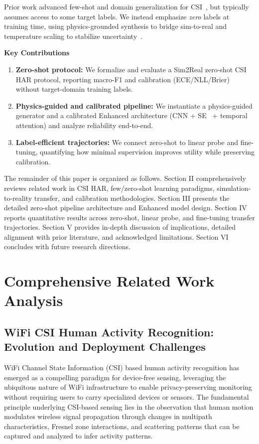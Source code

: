 \documentclass[journal]{IEEEtran}
\begin{document}
Prior work advanced few-shot and domain generalization for CSI~\cite{fewsense2022,airfi2022}, but typically assumes access to some target labels. We instead emphasize \emph{zero} labels at training time, using physics-grounded synthesis to bridge sim-to-real and temperature scaling to stabilize uncertainty~\cite{calibration_guo2017}.

\textbf{Key Contributions}
\begin{enumerate}
  \item \textbf{Zero-shot protocol:} We formalize and evaluate a Sim2Real zero-shot CSI HAR protocol, reporting macro-F1 and calibration (ECE/NLL/Brier) without target-domain training labels.
  \item \textbf{Physics-guided and calibrated pipeline:} We instantiate a physics-guided generator and a calibrated Enhanced architecture (CNN + SE~\cite{se_networks2018} + temporal attention) and analyze reliability end-to-end.
  \item \textbf{Label-efficient trajectories:} We connect zero-shot to linear probe and fine-tuning, quantifying how minimal supervision improves utility while preserving calibration.
\end{enumerate}

The remainder of this paper is organized as follows. Section II comprehensively reviews related work in CSI HAR, few/zero-shot learning paradigms, simulation-to-reality transfer, and calibration methodologies. Section III presents the detailed zero-shot pipeline architecture and Enhanced model design. Section IV reports quantitative results across zero-shot, linear probe, and fine-tuning transfer trajectories. Section V provides in-depth discussion of implications, detailed alignment with prior literature, and acknowledged limitations. Section VI concludes with future research directions.

\section{Comprehensive Related Work Analysis}

\subsection{WiFi CSI Human Activity Recognition: Evolution and Deployment Challenges}

WiFi Channel State Information (CSI) based human activity recognition has emerged as a compelling paradigm for device-free sensing, leveraging the ubiquitous nature of WiFi infrastructure to enable privacy-preserving monitoring without requiring users to carry specialized devices or sensors. The fundamental principle underlying CSI-based sensing lies in the observation that human motion modulates wireless signal propagation through changes in multipath characteristics, Fresnel zone interactions, and scattering patterns that can be captured and analyzed to infer activity patterns.
\end{document}
